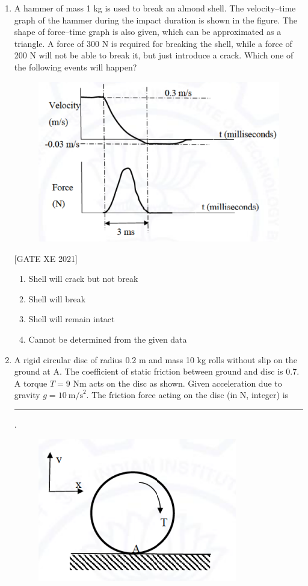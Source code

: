 \documentclass[journal,12pt,onecolumn]{IEEEtran}
\theoremstyle{remark}
\begin{document}
\begin{enumerate}[resume]
\item A hammer of mass 1 kg is used to break an almond shell. The velocity–time graph of the hammer during the impact duration is shown in the figure. The shape of force–time graph is also given, which can be approximated as a triangle. A force of 300 N is required for breaking the shell, while a force of 200 N will not be able to break it, but just introduce a crack. Which one of the following events will happen?

\begin{figure}[H]
      \centering
      \includegraphics[width=0.5\columnwidth]{figs/fig25.png}
      \caption{}
      \label{fig:placeholder}
  \end{figure}

\hfill[GATE XE 2021]

\begin{multicols}{2}
\begin{enumerate}
\item Shell will crack but not break
\item Shell will break
\item Shell will remain intact
\item Cannot be determined from the given data
\end{enumerate}
\end{multicols}


\item A rigid circular disc of radius 0.2 m and mass 10 kg rolls without slip on the ground at A. The coefficient of static friction between ground and disc is 0.7. A torque $T = 9$ Nm acts on the disc as shown. Given acceleration due to gravity $g = 10\ \text{m/s}^2$. The friction force acting on the disc (in N, integer) is \rule{3cm}{0.15mm}.

\begin{figure}[H]
      \centering
      \includegraphics[width=0.5\columnwidth]{figs/fig26.png}
      \caption{}
      \label{fig:placeholder}
  \end{figure}


\end{enumerate}
\end{document}
